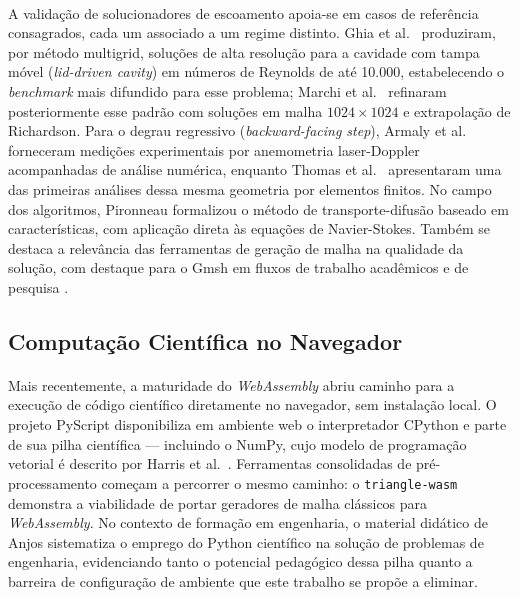 \paragraph{}A validação de solucionadores de escoamento apoia-se em casos de referência consagrados, cada um associado a um regime distinto. Ghia et al.\ \cite{Ghia1982} produziram, por método multigrid, soluções de alta resolução para a cavidade com tampa móvel (\textit{lid-driven cavity}) em números de Reynolds de até 10.000, estabelecendo o \textit{benchmark} mais difundido para esse problema; Marchi et al.\ \cite{Marchi2009} refinaram posteriormente esse padrão com soluções em malha $1024 \times 1024$ e extrapolação de Richardson. Para o degrau regressivo (\textit{backward-facing step}), Armaly et al.\ \cite{Armaly1983} forneceram medições experimentais por anemometria laser-Doppler acompanhadas de análise numérica, enquanto Thomas et al.\ \cite{Thomas1981} apresentaram uma das primeiras análises dessa mesma geometria por elementos finitos. No campo dos algoritmos, Pironneau \cite{Pironneau1982} formalizou o método de transporte-difusão baseado em características, com aplicação direta às equações de Navier-Stokes. Também se destaca a relevância das ferramentas de geração de malha na qualidade da solução, com destaque para o Gmsh em fluxos de trabalho acadêmicos e de pesquisa \cite{Geuzaine2009}.

\subsection{Computação Científica no Navegador}
\label{sec:computacao_navegador}
\paragraph{}Mais recentemente, a maturidade do \textit{WebAssembly} abriu caminho para a execução de código científico diretamente no navegador, sem instalação local. O projeto PyScript \cite{PyScript2023} disponibiliza em ambiente web o interpretador CPython e parte de sua pilha científica --- incluindo o NumPy, cujo modelo de programação vetorial é descrito por Harris et al.\ \cite{Harris2020}. Ferramentas consolidadas de pré-processamento começam a percorrer o mesmo caminho: o \texttt{triangle-wasm} \cite{TriangleWasm} demonstra a viabilidade de portar geradores de malha clássicos para \textit{WebAssembly}. No contexto de formação em engenharia, o material didático de Anjos \cite{Anjos2024} sistematiza o emprego do Python científico na solução de problemas de engenharia, evidenciando tanto o potencial pedagógico dessa pilha quanto a barreira de configuração de ambiente que este trabalho se propõe a eliminar.

